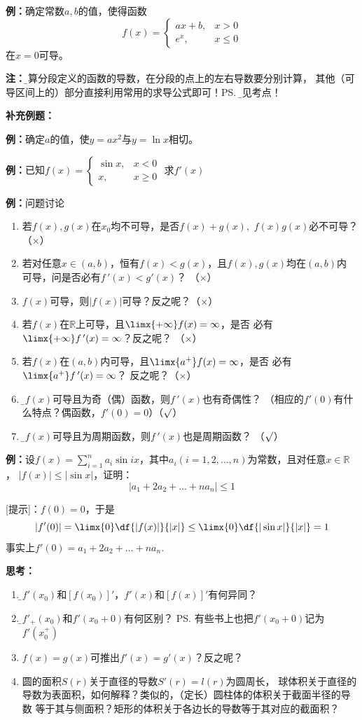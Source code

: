 {\bf 例：}确定常数$a,b$的值，使得函数
$$f(x)=\left\{\begin{array}{ll}ax+b,& x>0\\
e^x,& x\leq 0\end{array}\right.$$
在$x=0$可导。

{\bf 注：}{\b 计算分段定义的函数的导数，在分段的点上的左右导数要分别计算，
其他（可导区间上的）部分直接利用常用的求导公式即可！}\ps{\b 常见考点！}

{\bf 补充例题：}

{\bf 例：}确定$a$的值，使$y=ax^2$与$y=\ln x$相切。

{\bf 例：}已知$f(x)=\left\{\begin{array}{ll}
\sin x,& x<0\\ x,& x\geq 0
\end{array}\right.$
求$f'(x)$

{\bf 例：}问题讨论
\begin{enumerate}[(1)]
  \setlength{\itemindent}{1cm}
  \item 若$f(x),g(x)$在$x_0$均不可导，是否$f(x)+g(x),$ $f(x)g(x)$必不可导？
  （{$\times$}） 
  \item 若对任意$x\in (a,b)$，恒有$f(x)<g(x)$，且$f(x),g(x)$均在$(a,b)$内
  可导，问是否必有$f\,'(x)<g'(x)$？ （{$\times$}） 
  \item $f(x)$可导，则$|f(x)|$可导？反之呢？（{$\times$}）
  \item 若$f(x)$在$\mathbb{R}$上可导，且$\limx{+\infty}f(x)=\infty$，是否
  必有$\limx{+\infty}f\,'(x)=\infty$？反之呢？ （{$\times$}）
  \item 若$f(x)$在$(a,b)$内可导，且$\limx{a^+}f(x)=\infty$，是否
  必有$\limx{a^+}f\,'(x)=\infty$？ 反之呢？（{$\times$}） 
  \item {\b 若$f(x)$可导且为奇（偶）函数，则$f\,'(x)$也有奇偶性？ 
  （相应的$f'(0)$有什么特点？偶函数，$f'(0)=0$）（{$\surd$}）} 
  \item {\b 若$f(x)$可导且为周期函数，则$f\,'(x)$也是周期函数？ （{$\surd$}）}
\end{enumerate}

{\bf 例：}设$f(x)=\sum\limits_{i=1}^na_i\sin
ix$，其中$a_i(i=1,2,\ldots,n)$为常数，且对任意$x\in\mathbb{R}$， 
$|f(x)|\leq |\sin x|$，证明：
$$\left|a_1+2a_2+\ldots+na_n\right|\leq 1$$

[提示]：$f(0)=0$，于是
$$|f'(0)|=\limx{0}\df{|f(x)|}{|x|}\leq\limx{0}\df{|\sin x|}{|x|}=1$$
事实上$f'(0)=a_1+2a_2+\ldots+na_n$.

{\bf 思考：}
\begin{enumerate} 
  \setlength{\itemindent}{1cm}
  \item {\b $f'(x_0)$和$[f(x_0)]'$，$f'(x)$和$[f(x)]'$有何异同？}
  \item {\b $f'_+(x_0)$和$f'(x_0+0)$有何区别？}
  \ps{有些书上也把$f'(x_0+0)$记为$f'(x_0^+)$}
  \item $f(x)=g(x)$可推出$f'(x)=g'(x)$？反之呢？
  \item 圆的面积$S(r)$关于直径的导数$S'(r)=l(r)$为圆周长，
  球体积关于直径的导数为表面积，如何解释？类似的，（定长）圆柱体的体积关于截面半径的导数
  等于其与侧面积？矩形的体积关于各边长的导数等于其对应的截面积？
\end{enumerate}

